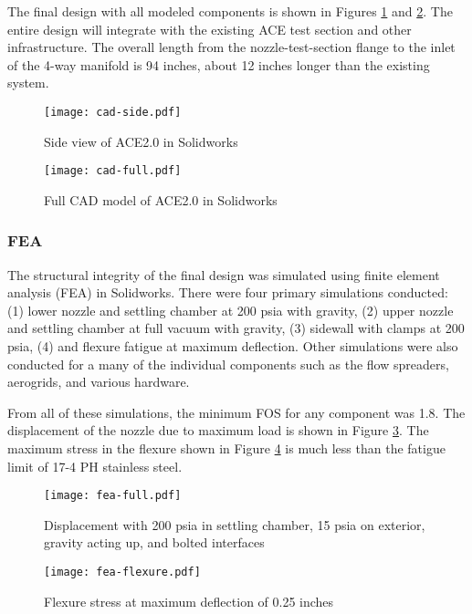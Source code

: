 The final design with all modeled components is shown in Figures \ref{fig:cad-side} and \ref{fig:cad-full}. The entire design will integrate with the existing ACE test section and other infrastructure. The overall length from the nozzle-test-section flange to the inlet of the 4-way manifold is 94 inches, about 12 inches longer than the existing system.

\begin{figure}[ht!]
    \centering
    \texttt{[image: cad-side.pdf]}
    \caption{Side view of ACE2.0 in Solidworks}
    \label{fig:cad-side}
\end{figure}

\begin{figure}[ht!]
    \centering
    \texttt{[image: cad-full.pdf]}
    \caption{Full CAD model of ACE2.0 in Solidworks}
    \label{fig:cad-full}
\end{figure}

\clearpage

\subsubsection*{FEA}

The structural integrity of the final design was simulated using finite element analysis (FEA) in Solidworks. There were four primary simulations conducted: (1) lower nozzle and settling chamber at 200 psia with gravity, (2) upper nozzle and settling chamber at full vacuum with gravity, (3) sidewall with clamps at 200 psia, (4) and flexure fatigue at maximum deflection. Other simulations were also conducted for a many of the individual components such as the flow spreaders, aerogrids, and various hardware.

From all of these simulations, the minimum FOS for any component was 1.8. The displacement of the nozzle due to maximum load is shown in Figure \ref{fig:fea-full}. The maximum stress in the flexure shown in Figure \ref{fig:fea-flexure} is much less than the fatigue limit of 17-4 PH stainless steel.

\begin{figure}[ht!]
    \centering
    \texttt{[image: fea-full.pdf]}
    \caption{Displacement with 200 psia in settling chamber, 15 psia on exterior, gravity acting up, and bolted interfaces}
    \label{fig:fea-full}
\end{figure}

\begin{figure}[ht!]
    \centering
    \texttt{[image: fea-flexure.pdf]}
    \caption{Flexure stress at maximum deflection of 0.25 inches}
    \label{fig:fea-flexure}
\end{figure}

